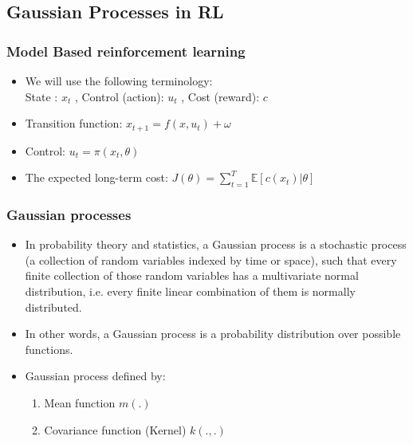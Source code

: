 \documentclass{beamer}
\begin{document}
\subsection{Gaussian Processes in RL}
\begin{frame}
  \frametitle{Model Based reinforcement learning}
\begin{center}
 \captionsetup{labelformat=empty}
\end{center}
\begin{itemize}
    \item We will use the following terminology:\\
    State : $x_t$ , Control (action): $u_t$ , Cost (reward): $c$
    \item Transition function: $x_{t+1}=f(x,u_t)+\omega$
    \item Control: $u_t=\pi (x_t,\theta )$
    \item The expected long-term cost:  $J(\theta)=\sum_{t=1}^{T} \mathbb{E} [c(x_t)|\theta]$
\end{itemize}
\end{frame}

\begin{frame}
	\frametitle{Gaussian processes}
    \begin{itemize}
    \item In probability theory and statistics, a Gaussian process is a stochastic process (a collection of random variables indexed by time or space), such that every finite collection of those random variables has a multivariate normal distribution, i.e. every finite linear combination of them is normally distributed.
    \item In other words, a  Gaussian process is a probability distribution over possible functions.
    \item Gaussian process defined by:
    \begin{enumerate}
        \item Mean function $m(.)$
        \item Covariance function (Kernel) $k(.,.)$
    \end{enumerate}
    \end{itemize}
\end{frame}
\end{document}
